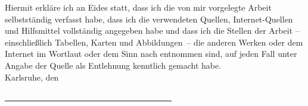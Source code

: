 \thispagestyle{empty}
\vspace*{13.5cm}
Hiermit erkläre ich an Eides statt, dass ich die von mir vorgelegte Arbeit
selbstständig verfasst habe, dass ich die verwendeten Quellen,
Internet-Quellen und Hilfsmittel vollständig angegeben habe und dass ich die
Stellen der Arbeit -- einschließlich Tabellen, Karten und Abbildungen~-- die
anderen Werken oder dem Internet im Wortlaut oder dem Sinn nach entnommen
sind, auf jeden Fall unter Angabe der Quelle als Entlehnung kenntlich gemacht
habe.\\

Karlsruhe, den \\
\medskip
\medskip

\underline{~~~~~~~~~~~~~~~~~~~~~~~~~~~~~~~~~~~~~~~~}\\
\myname
